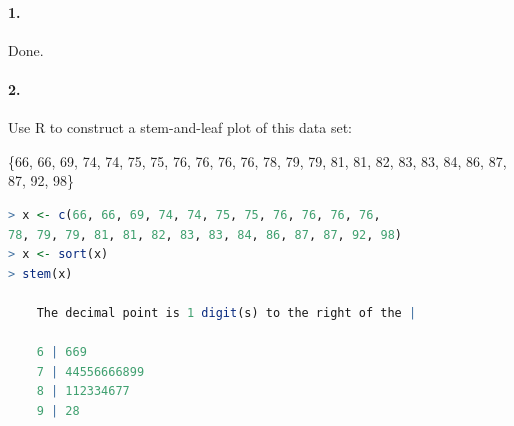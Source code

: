 

\usepackage{graphicx}
\usepackage[]{mdframed}

\graphicspath{ {./images/} }

\renewcommand\classname{STAT F300 Statistics, Dr. Short}

\renewcommand\assignment{Homework 2, Due Friday, January 27, 23:59}

    \paragraph*{1.}
    \begin{mdframed}
        Done.
    \end{mdframed}

    \paragraph*{2.}
    Use R to construct a stem-and-leaf plot of this data set:

    \{66, 66, 69, 74, 74, 75, 75, 76, 76, 76, 76, 78, 79, 79, 81, 81, 82, 83, 83, 84, 86, 87, 87, 92, 98\}

    \begin{mdframed}
        \begin{lstlisting}[language=R]
> x <- c(66, 66, 69, 74, 74, 75, 75, 76, 76, 76, 76, 
78, 79, 79, 81, 81, 82, 83, 83, 84, 86, 87, 87, 92, 98)
> x <- sort(x)
> stem(x)

    The decimal point is 1 digit(s) to the right of the |

    6 | 669
    7 | 44556666899
    8 | 112334677
    9 | 28
        \end{lstlisting}
    \end{mdframed}

